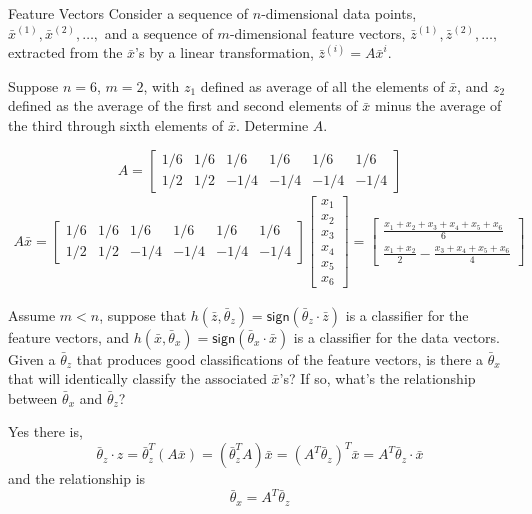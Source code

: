 \documentclass[12pt, letterpaper]{article}
\begin{document}
\begin{problem}{Feature Vectors}
    Consider a sequence of $n$-dimensional data points, $\bar{x}^{(1)}, \bar{x}^{(2)},\dots,$ and a sequence of $m$-dimensional feature vectors, $\bar{z}^{(1)}, \bar{z}^{(2)},\dots,$
    extracted from the $\bar{x}$'s by a linear transformation, $\bar{z}^{(i)}=A\bar{x}^{i}$.
\end{problem}
\begin{subproblem}{}
    Suppose $n=6$, $m=2$, with $z_1$ defined as average of all the elements of $\bar{x}$, and $z_2$ defined as the
    average of the first and second elements of $\bar{x}$ minus the average of the third through sixth elements of $\bar{x}$.
    Determine $A$.
\end{subproblem}
\begin{solution}
    \[
    A = \begin{bmatrix}
        1/6  & 1/6 & 1/6 & 1/6 & 1/6 & 1/6\\
        1/2 & 1/2 & -1/4 & -1/4 & -1/4 & -1/4
    \end{bmatrix}
    \]
    \begin{align*}
        A\bar{x}=\begin{bmatrix}
        1/6  & 1/6 & 1/6 & 1/6 & 1/6 & 1/6\\
        1/2 & 1/2 & -1/4 & -1/4 & -1/4 & -1/4
    \end{bmatrix}\begin{bmatrix}
        x_1\\x_2\\x_3\\x_4\\x_5\\x_6
    \end{bmatrix}=
    \begin{bmatrix}
        \frac{x_1+x_2+x_3+x_4+x_5+x_6}{6}\\
        \frac{x_1+x_2}{2} - \frac{x_3+x_4+x_5+x_6}{4}
    \end{bmatrix}
    \end{align*}
\end{solution}

\begin{subproblem}{}
    Assume $m<n$, suppose that $h(\bar{z},\bar{\theta}_z)=\mathsf{sign}(\bar{\theta}_z \cdot \bar{z})$
    is a classifier for the feature vectors, and $h(\bar{x},\bar{\theta}_x)=\mathsf{sign}(\bar{\theta}_x \cdot \bar{x})$
    is a classifier for the data vectors. Given a $\bar{\theta}_z$ that produces good classifications
    of the feature vectors, is there a $\bar{\theta}_x$ that will identically classify the associated $\bar{x}$'s? If so, what's the
    relationship between $\bar{\theta}_x$ and $\bar{\theta}_z$?
\end{subproblem}
\begin{solution}
    Yes there is,
    \[\bar{\theta}_z \cdot z = \bar{\theta}_z^T(A\bar{x}) = (\bar{\theta}_z^T A)\bar{x}
    =(A^T\bar{\theta}_z)^T\bar{x}=A^T\bar{\theta}_z \cdot \bar{x}\]
    and the relationship is
    \[\bar{\theta}_x=A^T\bar{\theta}_z\]
\end{solution}
\end{document}
